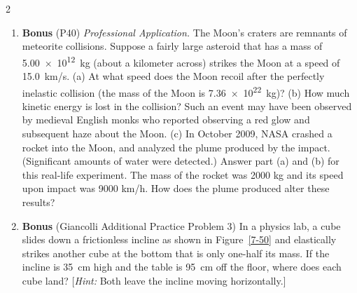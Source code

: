 \documentclass[10pt]{exam}
\def\myquestion{\item\stepcounter{endnote}}
\newenvironment{myquestions}{
  \begin{multicols*}{2}\begin{enumerate}
}{
  \end{enumerate}\end{multicols*}
}
\begin{document}
\begin{myquestions}



\myquestion \textbf{Bonus} (P40) \label{b2}
\emph{Professional Application.} The Moon's craters are remnants of meteorite collisions. Suppose a fairly large asteroid that has a mass of \SI{5.00e12}{kg}  (about a kilometer across) strikes the Moon at a speed of 15.0~km/s. (a) At what speed does the Moon recoil after the perfectly inelastic collision (the mass of the Moon is \SI{7.36e22}{kg})? (b) How much kinetic energy is lost in the collision? Such an event may have been observed by medieval English monks who reported observing a red glow and subsequent haze about the Moon. (c) In October 2009, NASA crashed a rocket into the Moon, and analyzed the plume produced by the impact. (Significant amounts of water were detected.) Answer part (a) and (b) for this real-life experiment. The mass of the rocket was 2000 kg and its speed upon impact was 9000 km/h. How does the plume produced alter these results?

\myquestion \textbf{Bonus} (Giancolli Additional Practice Problem 3) \label{b3}
In a physics lab, a cube slides down a frictionless incline as shown in Figure~\ref{7-50} and elastically strikes another cube at the bottom that is only one-half its mass. If the incline is 35~cm high and the table is 95~cm off the floor, where does each cube land? [\emph{Hint:} Both leave the incline moving horizontally.]


\end{myquestions}
\end{document}
